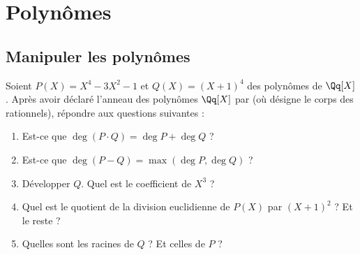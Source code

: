 \documentclass[class=report,crop=false]{standalone}
\begin{document}


\setcounter{section}{7}
\section{Polynômes}

\subsection{Manipuler les polynômes}

\begin{tp}
Soient  $P(X) = X^4-3X^2-1$ et $Q(X) = (X+1)^4$ des polynômes de $\Qq[X]$.
Après avoir déclaré l'anneau des polynômes $\Qq[X]$ par  
(où  désigne le corps des rationnels), répondre aux questions suivantes :
\begin{enumerate}
  \item Est-ce que $\deg(P \cdot Q) = \deg P + \deg Q$ ?
  \item Est-ce que $\deg(P - Q) = \max( \deg P, \deg Q )$ ?
  \item Développer $Q$. Quel est le coefficient de $X^3$ ?
  \item Quel est le quotient de la division euclidienne de $P(X)$ par $(X+1)^2$ ?
  Et le reste ?
  \item Quelles sont les racines de $Q$ ? Et celles de $P$ ?
\end{enumerate}
\end{tp}
\end{document}
